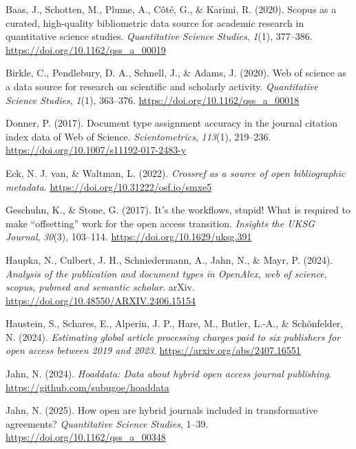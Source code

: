 \documentclass[a4paper,man,floatsintext,longtable,noextraspace,10pt]{apa6}
\newlength{\cslhangindent}
\newenvironment{CSLReferences}[2] %
{\begin{list}{}{%
  \setlength{\itemindent}{0pt}
  \setlength{\leftmargin}{0pt}
  \setlength{\parsep}{0pt}
  \ifodd #1
  \setlength{\leftmargin}{\cslhangindent}
  \setlength{\itemindent}{-1\cslhangindent}
  \fi
  \setlength{\itemsep}{#2\baselineskip}}}
{\end{list}}
\begin{document}
\label{refs}
\begin{CSLReferences}{1}{0}
Baas, J., Schotten, M., Plume, A., Côté, G., \& Karimi, R. (2020).
Scopus as a curated, high-quality bibliometric data source for academic
research in quantitative science studies. \emph{Quantitative Science
Studies}, \emph{1}(1), 377--386.
\url{https://doi.org/10.1162/qss_a_00019}

Birkle, C., Pendlebury, D. A., Schnell, J., \& Adams, J. (2020). Web of
science as a data source for research on scientific and scholarly
activity. \emph{Quantitative Science Studies}, \emph{1}(1), 363--376.
\url{https://doi.org/10.1162/qss_a_00018}

Donner, P. (2017). Document type assignment accuracy in the journal
citation index data of {Web of Science}. \emph{Scientometrics},
\emph{113}(1), 219--236. \url{https://doi.org/10.1007/s11192-017-2483-y}

Eck, N. J. van, \& Waltman, L. (2022). \emph{Crossref as a source of
open bibliographic metadata}.
\url{https://doi.org/10.31222/osf.io/smxe5}

Geschuhn, K., \& Stone, G. (2017). It's the workflows, stupid! What is
required to make {``offsetting''} work for the open access transition.
\emph{Insights the {UKSG} Journal}, \emph{30}(3), 103--114.
\url{https://doi.org/10.1629/uksg.391}

Haupka, N., Culbert, J. H., Schniedermann, A., Jahn, N., \& Mayr, P.
(2024). \emph{Analysis of the publication and document types in
OpenAlex, web of science, scopus, pubmed and semantic scholar}. arXiv.
\url{https://doi.org/10.48550/ARXIV.2406.15154}

Haustein, S., Schares, E., Alperin, J. P., Hare, M., Butler, L.-A., \&
Schönfelder, N. (2024). \emph{Estimating global article processing
charges paid to six publishers for open access between 2019 and 2023}.
\url{https://arxiv.org/abs/2407.16551}

Jahn, N. (2024). \emph{Hoaddata: Data about hybrid open access journal
publishing}. \url{https://github.com/subugoe/hoaddata}

Jahn, N. (2025). How open are hybrid journals included in transformative
agreements? \emph{Quantitative Science Studies}, 1--39.
\url{https://doi.org/10.1162/qss_a_00348}


\end{CSLReferences}
\end{document}
